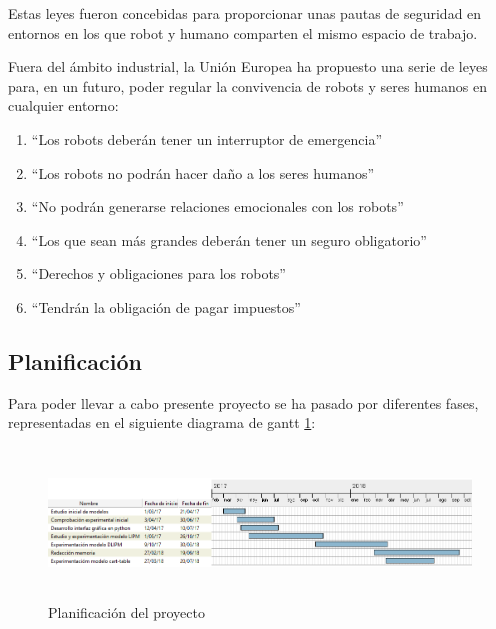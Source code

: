 Estas leyes fueron concebidas para proporcionar unas pautas de seguridad en entornos en los que robot y humano comparten el mismo espacio de trabajo.

Fuera del ámbito industrial, la Unión Europea ha propuesto una serie de leyes para, en un futuro, poder regular la convivencia de robots y seres humanos en cualquier entorno:

\begin{enumerate}

\item ``Los robots deberán tener un interruptor de emergencia''

\item ``Los robots no podrán hacer daño a los seres humanos''

\item ``No podrán generarse relaciones emocionales con los robots''

\item ``Los que sean más grandes deberán tener un seguro obligatorio''

\item ``Derechos y obligaciones para los robots''

\item ``Tendrán la obligación de pagar impuestos''

\end{enumerate}

\newpage

\subsection{Planificación}

Para poder llevar a cabo presente proyecto se ha pasado por diferentes fases, representadas en el siguiente diagrama de gantt \ref{figura2}:

\begin{figure}[H]
\centering
\includegraphics[width=15cm, height=4cm]{imagenes/apartado_1/12_planificacion_v1}
\caption{Planificación del proyecto}
\label{figura2}
\end{figure}

